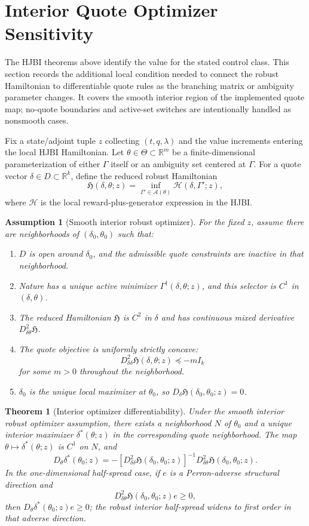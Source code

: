 \documentclass[11pt]{article}
\newtheorem{assumption}{Assumption}
\newtheorem{theorem}{Theorem}
\newcommand{\R}{\mathbb{R}}
\begin{document}
\section{Interior Quote Optimizer Sensitivity}

The HJBI theorems above identify the value for the stated control class. This
section records the additional local condition needed to connect the robust
Hamiltonian to differentiable quote rules as the branching matrix or ambiguity
parameter changes. It covers the smooth interior region of the implemented
quote map; no-quote boundaries and active-set switches are intentionally
handled as nonsmooth cases.

Fix a state/adjoint tuple $z$ collecting $(t,q,\lambda)$ and the value
increments entering the local HJBI Hamiltonian. Let $\theta\in\Theta\subset
\R^m$ be a finite-dimensional parameterization of either $\Gamma$ itself or an
ambiguity set centered at $\Gamma$. For a quote vector $\delta\in D\subset
\R^k$, define the reduced robust Hamiltonian
\[
\mathfrak H(\delta,\theta;z)
=\inf_{\Gamma'\in\mathcal A(\theta)}
\mathcal H(\delta,\Gamma';z),
\]
where $\mathcal H$ is the local reward-plus-generator expression in the HJBI.

\begin{assumption}[Smooth interior robust optimizer]
For the fixed $z$, assume there are neighborhoods of
$(\delta_0,\theta_0)$ such that:
\begin{enumerate}
\item $D$ is open around $\delta_0$, and the admissible quote constraints are
inactive in that neighborhood.
\item Nature has a unique active minimizer
$\Gamma^\dagger(\delta,\theta;z)$, and this selector is $C^1$ in
$(\delta,\theta)$.
\item The reduced Hamiltonian $\mathfrak H$ is $C^2$ in $\delta$ and has
continuous mixed derivative $D^2_{\delta\theta}\mathfrak H$.
\item The quote objective is uniformly strictly concave:
\[
D^2_{\delta\delta}\mathfrak H(\delta,\theta;z)\preceq -m I_k
\]
for some $m>0$ throughout the neighborhood.
\item $\delta_0$ is the unique local maximizer at $\theta_0$, so
$D_\delta\mathfrak H(\delta_0,\theta_0;z)=0$.
\end{enumerate}
\end{assumption}

\begin{theorem}[Interior optimizer differentiability]
Under the smooth interior robust optimizer assumption, there exists a
neighborhood $N$ of $\theta_0$ and a unique interior maximizer
$\delta^*(\theta;z)$ in the corresponding quote neighborhood. The map
$\theta\mapsto\delta^*(\theta;z)$ is $C^1$ on $N$, and
\[
D_\theta\delta^*(\theta_0;z)
=
-\left[
D^2_{\delta\delta}\mathfrak H(\delta_0,\theta_0;z)
\right]^{-1}
D^2_{\delta\theta}\mathfrak H(\delta_0,\theta_0;z).
\]
In the one-dimensional half-spread case, if $e$ is a Perron-adverse structural
direction and
\[
D^2_{\delta\theta}\mathfrak H(\delta_0,\theta_0;z)e\ge0,
\]
then $D_\theta\delta^*(\theta_0;z)e\ge0$; the robust interior half-spread
widens to first order in that adverse direction.
\end{theorem}
\end{document}
